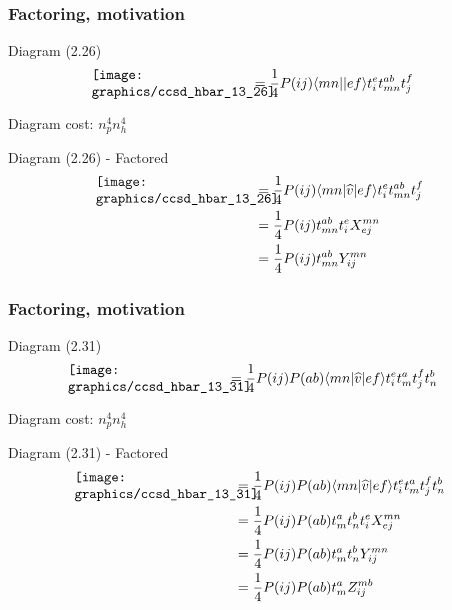 \begin{frame}
    \frametitle{Factoring, motivation}

\small
\begin{block}{Diagram (2.26)}
    \begin{align*}
        \parbox{40mm}{\texttt{[image: graphics/ccsd\_hbar\_13\_26]}}
        &= \frac{1}{4} P(ij) \bra{mn}\ket{ef} t_i^e t_{mn}^{ab} t_j^f
    \end{align*}
\end{block}
Diagram cost: $n_p^4 n_h^4$
\begin{block}{Diagram (2.26) - Factored}
    \begin{align*}
        \parbox{40mm}{\texttt{[image: graphics/ccsd\_hbar\_13\_26]}}
        &= \frac{1}{4} P(ij) \bra{mn}\op{v}\ket{ef} t_i^e t_{mn}^{ab} t_j^f \\
        &= \frac{1}{4} P(ij) t_{mn}^{ab} t_i^e X_{ej}^{mn} \\
        &= \frac{1}{4} P(ij) t_{mn}^{ab} Y^{mn}_{ij}
    \end{align*}
\end{block}
\end{frame}



\begin{frame}
    \frametitle{Factoring, motivation}

\scriptsize
\begin{block}{Diagram (2.31)}
    \begin{align*}
        \parbox{40mm}{\texttt{[image: graphics/ccsd\_hbar\_13\_31]}}
        &= \frac{1}{4} P(ij) P(ab) \bra{mn}\op{v}\ket{ef} t_i^e t_m^a t_j^f t_n^b
    \end{align*}
\end{block}
Diagram cost: $n_p^4 n_h^4$
\begin{block}{Diagram (2.31) - Factored}
    \begin{align*}
        \parbox{40mm}{\texttt{[image: graphics/ccsd\_hbar\_13\_31]}}
        &= \frac{1}{4} P(ij) P(ab) \bra{mn}\op{v}\ket{ef} t_i^e t_m^a t_j^f t_n^b \\
        &= \frac{1}{4} P(ij) P(ab) t_m^a t_n^b t_i^e X_{ej}^{mn} \\
        &= \frac{1}{4} P(ij) P(ab) t_m^a t_n^b Y_{ij}^{mn} \\
        &= \frac{1}{4} P(ij) P(ab) t_m^a Z_{ij}^{mb}
    \end{align*}
\end{block}
\end{frame}

